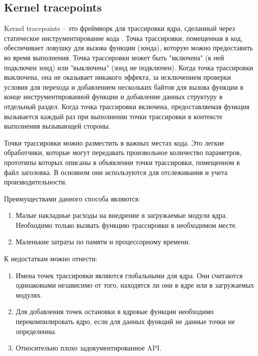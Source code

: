 	\subsection{Kernel tracepoints}
		Kernel tracepoints -- это фреймворк для трассировки ядра, 
		сделанный через статическое инструментирование кода \cite{linux-kernel-tracepoints}.
		Точка трассировки, помещенная в код, обеспечивает ловушку для вызова функции (зонда),
		которую можно предоставить во время выполнения. 
		Точка трассировки может быть "включена" (к ней подключен зонд) или "выключена" (зонд не подключен).
		Когда точка трассировки выключена, она не оказывает никакого эффекта, 
		за исключением проверки условия для перехода и добавлением нескольких байтов для вызова функции 
		в конце инструментированной функции и добавление данных структуру в отдельный раздел.
		Когда точка трассировки включена, предоставляемая функция вызывается каждый раз при выполнении точки трассировки
		в контексте выполнения вызывающей стороны.

		Точки трассировки можно разместить в важных местах кода. 
		Это легкие обработчики, которые могут передавать произвольное количество параметров,
		прототипы которых описаны в объявлении точки трассировки, помещенном в файл заголовка.
		В основном они используются для отслеживания и учета производительности.
		
		Преимуществами данного способа являются:
		\begin{enumerate}
			\item Малые накладные расходы на внедрение в загружаемые модули ядра.
				Необходимо только вызвать функцию трассировки в необходимом месте.

			\item Маленькие затраты по памяти и процессорному времени.
		\end{enumerate}

		К недостаткам можно отнести:
		\begin{enumerate}
			\item Имена точек трассировки являются глобальными для ядра. 
			Они считаются одинаковыми независимо от того, находятся ли они в ядре или в загружаемых модулях.
			\item Для добавления точек остановки в ядровые функции необходимо перекомпилировать ядро,
			если для данных функций не данные точки не определенны.
			\item Относительно плохо задокументированное API.
		\end{enumerate}
		
